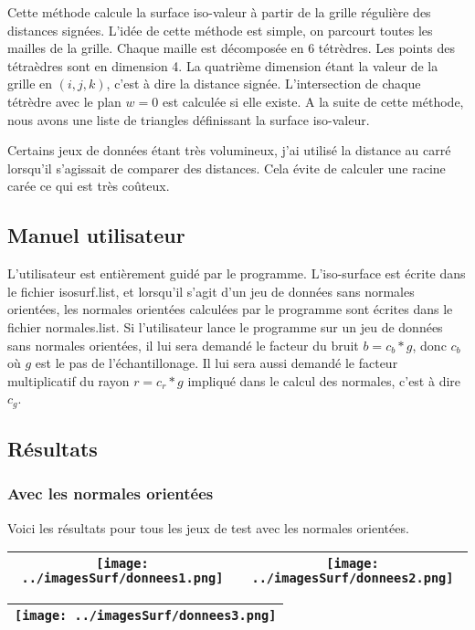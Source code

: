 \documentclass[11pt,a4paper]{article}
\begin{document}
Cette méthode calcule la surface iso-valeur à partir de la grille régulière des distances signées. L'idée de cette méthode est simple, on parcourt
toutes les mailles de la grille. Chaque maille est décomposée en 6 tétrèdres. Les points des tétraèdres sont en dimension 4. La quatrième dimension
étant la valeur de la grille en $(i,j,k)$, c'est à dire la distance signée. L'intersection de chaque tétrèdre avec le plan $w=0$ est calculée si elle existe.
A la suite de cette méthode, nous avons une liste de triangles définissant la surface iso-valeur.

Certains jeux de données étant très volumineux, j'ai utilisé la distance au carré lorsqu'il s'agissait de comparer des distances. Cela évite de calculer une
racine carée ce qui est très coûteux.

\subsection{Manuel utilisateur}
L'utilisateur est entièrement guidé par le programme. L'iso-surface est écrite dans le fichier isosurf.list, et lorsqu'il s'agit
d'un jeu de données sans normales orientées, les normales orientées calculées par le programme sont écrites dans le fichier normales.list.
Si l'utilisateur lance le programme sur un jeu de données sans normales orientées, il lui sera demandé le facteur du bruit $b=c_b*g$, donc
$c_b$ où $g$ est le pas de l'échantillonage. Il lui sera aussi demandé le facteur multiplicatif du rayon $r=c_r*g$ impliqué dans le calcul des normales,
c'est à dire $c_g$.

\pagebreak

\subsection{Résultats}
\subsubsection{Avec les normales orientées}
Voici les résultats pour tous les jeux de test avec les normales orientées.

\begin{center}
\begin{tabular}{|c|c|}
\hline
\texttt{[image: ../imagesSurf/donnees1.png]} & \texttt{[image: ../imagesSurf/donnees2.png]}\\
\hline
\end{tabular}
\begin{tabular}{|c|}
\texttt{[image: ../imagesSurf/donnees3.png]}\\
\hline
\end{tabular}
\end{center}
\end{document}
